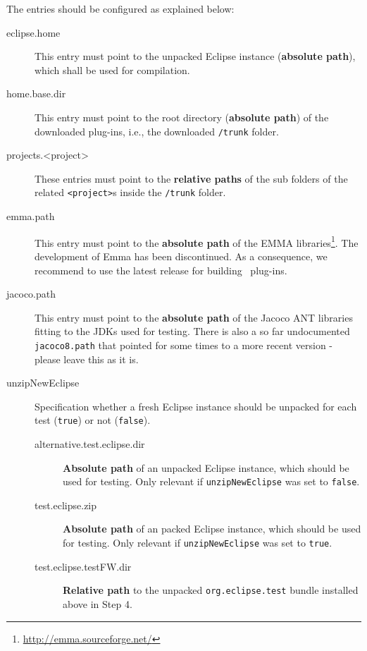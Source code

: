 The entries should be configured as explained below:
\begin{description}
	\item[eclipse.home] $ $\\
		This entry must point to the unpacked Eclipse instance (\textbf{absolute path}), which shall be used for compilation.
	\item[home.base.dir] $ $\\
		This entry must point to the root directory (\textbf{absolute path}) of the downloaded plug-ins, i.e., the downloaded \texttt{/trunk} folder.
	\item[projects.<project>] $ $\\
		These entries must point to the \textbf{relative paths} of the sub folders of the related \texttt{<project>}s inside the \texttt{/trunk} folder.
	\item[emma.path] $ $\\
		This entry must point to the \textbf{absolute path} of the EMMA libraries\footnote{\url{http://emma.sourceforge.net/}}. The development of Emma has been discontinued. As a consequence, we recommend to use the latest release for building \EASy\ plug-ins.
      \item[jacoco.path] $ $\\
             This entry must point to the \textbf{absolute path} of the Jacoco ANT libraries fitting to the JDKs used for testing. There is also a so far undocumented \texttt{jacoco8.path} that pointed for some times to a more recent version - please leave this as it is.
	\item[unzipNewEclipse] $ $\\
		Specification whether a fresh Eclipse instance should be unpacked for each test (\texttt{true}) or not (\texttt{false}).	
	\begin{description}
		\item[alternative.test.eclipse.dir] $ $\\
			\textbf{Absolute path} of an unpacked Eclipse instance, which should be used for testing. Only relevant if \texttt{unzipNewEclipse} was set to \texttt{false}.
	\item[test.eclipse.zip] $ $\\
			\textbf{Absolute path} of an packed Eclipse instance, which should be used for testing. Only relevant if \texttt{unzipNewEclipse} was set to \texttt{true}.
      \item[test.eclipse.testFW.dir] $ $\\
                   \textbf{Relative path} to the unpacked \texttt{org.eclipse.test} bundle installed above in Step 4.

\end{description}
\end{description}
